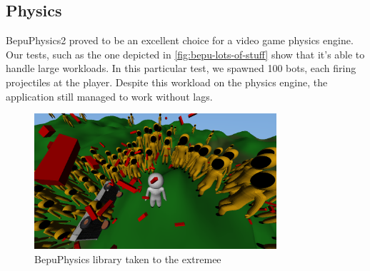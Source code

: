 \subsection{Physics}\label{subsec:physics}
BepuPhysics2 proved to be an excellent choice for a video game physics engine.
Our tests, such as the one depicted in \autoref{fig:bepu-lots-of-stuff} show that it's able to handle large workloads.
In this particular test, we spawned 100 bots, each firing projectiles at the player.
Despite this workload on the physics engine, the application still managed to work without lags.
\begin{figure}[h]
    \centering
    \includegraphics[width=0.8\textwidth]{chapters/results/sections/gameplay/resources/lots-of-stuff.png}
    \caption{BepuPhysics library taken to the extremee}
    \label{fig:bepu-lots-of-stuff}
\end{figure}